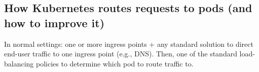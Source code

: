 \documentclass[letterpaper,twocolumn,10pt]{article}
\let\origref\ref
\def\ref#1{\textbf{\origref{#1}}}
\begin{document}
%
% 


\subsection{How Kubernetes routes requests to pods (and how to improve
  it)}

\it

In normal settings: one or more ingress points + any standard solution
to direct end-user traffic to one ingress point (e.g., DNS). Then, one
of the standard load-balancing policies to determine which pod to
route traffic to.
\end{document}

